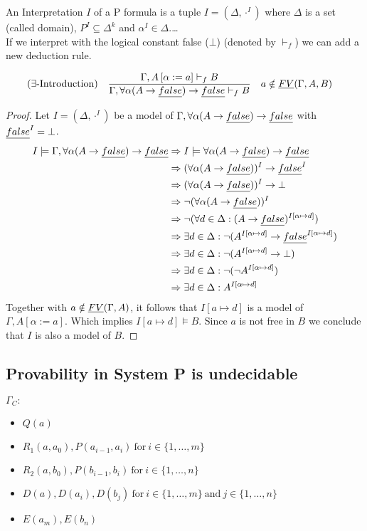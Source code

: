 An Interpretation $I$ of a P formula is a tuple $I=(\Delta,\cdot^I)$ where $\Delta$ is a set (called domain), $P^I\subseteq\Delta^k$ and $\alpha^I\in\Delta$.\dots\\
If we interpret \false{} with the logical constant false ($\bot$) (denoted by $\vdash_f$) we can add a new deduction rule.
\begin{mdframed}
\begin{align*}
&(\exists\text{-Introduction}) &&\frac
{\Gamma,A\left[\alpha:=a\right]\vdash_f B}
{\Gamma,\forall\alpha(A\to\emph{false})\to\emph{false}\vdash_f B} && a\notin\emph{FV}(\Gamma,A,B)
\end{align*}
\end{mdframed}
\begin{proof}
Let $I=(\Delta,\cdot^I)$ be a model of $\Gamma,\forall\alpha(A\to\emph{false})\to\emph{false}$ with $\emph{false}^I=\bot$.
\begin{align*}
I\models\Gamma,\forall\alpha(A\to\emph{false})\to\emph{false}&\Rightarrow I\models\forall\alpha(A\to\emph{false})\to\emph{false}\\
&\Rightarrow (\forall\alpha(A\to\emph{false}))^I\to\emph{false}^I\\
&\Rightarrow (\forall\alpha(A\to\emph{false}))^I\to\bot\\
&\Rightarrow \neg(\forall\alpha(A\to\emph{false}))^I\\
&\Rightarrow \neg(\forall d\in\Delta:(A\to\emph{false})^{I\left[\alpha\mapsto d\right]})\\
&\Rightarrow \exists d\in\Delta:\neg(A^{I\left[\alpha\mapsto d\right]}\to\emph{false}^{I\left[\alpha\mapsto d\right]})\\
&\Rightarrow \exists d\in\Delta:\neg(A^{I\left[\alpha\mapsto d\right]}\to\bot)\\
&\Rightarrow \exists d\in\Delta:\neg(\neg A^{I\left[\alpha\mapsto d\right]})\\
&\Rightarrow \exists d\in\Delta:A^{I\left[\alpha\mapsto d\right]}\\
\end{align*}
Together with $a\notin\emph{FV}(\Gamma,A)$, it follows that $I\left[a\mapsto d\right]$ is a model of $\Gamma,A\left[\alpha:=a\right]$. Which implies $I\left[a\mapsto d\right]\models B$.	Since $a$ is not free in $B$ we conclude that $I$ is also a model of $B$.
\end{proof}
\subsection{Provability in System P is undecidable} %
$\Gamma_C:$
\begin{itemize}
\item $Q(a)$
\item $R_1(a,a_0),P(a_{i-1},a_i)~\text{for}~i\in\{1,\dots,m\}$
\item $R_2(a,b_0),P(b_{i-1},b_i)~\text{for}~i\in\{1,\dots,n\}$
\item $D(a),D(a_i),D(b_j)~\text{for}~i\in\{1,\dots,m\}~\text{and}~j\in\{1,\dots,n\}$
\item $E(a_m),E(b_n)$
\end{itemize}

